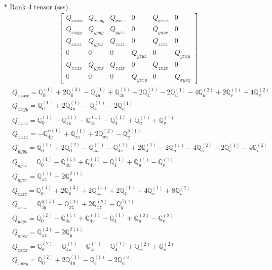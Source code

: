\documentclass[fleqn,8pt,landscape]{jsarticle}
\begin{document}
* Rank 4 tensor (sss).
\begin{align*}
\begin{bmatrix} Q_{xxxx} & Q_{xxyy} & Q_{xxzz} & 0 & Q_{xxzx} & 0 \\ Q_{xxyy} & Q_{yyyy} & Q_{yyzz} & 0 & Q_{yyzx} & 0 \\ Q_{xxzz} & Q_{yyzz} & Q_{zzzz} & 0 & Q_{zzzx} & 0 \\ 0 & 0 & 0 & Q_{yzyz} & 0 & Q_{yzxy} \\ Q_{xxzx} & Q_{yyzx} & Q_{zzzx} & 0 & Q_{zxzx} & 0 \\ 0 & 0 & 0 & Q_{yzxy} & 0 & Q_{xyxy} \end{bmatrix}
\end{align*}
\begin{align*}
& Q_{xxxx} = \mathbb{Q}_{0}^{(1)} + 2 \mathbb{Q}_{0}^{(2)} - \mathbb{Q}_{4u}^{(1)} + \mathbb{Q}_{4v}^{(1)} + 2 \mathbb{Q}_{4}^{(1)} - 2 \mathbb{Q}_{u}^{(1)} - 4 \mathbb{Q}_{u}^{(2)} + 2 \mathbb{Q}_{v}^{(1)} + 4 \mathbb{Q}_{v}^{(2)} \\
& Q_{xxyy} = \mathbb{Q}_{0}^{(1)} + 2 \mathbb{Q}_{4u}^{(1)} - \mathbb{Q}_{4}^{(1)} - 2 \mathbb{Q}_{u}^{(1)} \\
& Q_{xxzz} = \mathbb{Q}_{0}^{(1)} - \mathbb{Q}_{4u}^{(1)} - \mathbb{Q}_{4v}^{(1)} - \mathbb{Q}_{4}^{(1)} + \mathbb{Q}_{u}^{(1)} + \mathbb{Q}_{v}^{(1)} \\
& Q_{xxzx} = - \mathbb{Q}_{4y}^{\alpha(1)} + \mathbb{Q}_{xz}^{(1)} + 2 \mathbb{Q}_{xz}^{(2)} - \mathbb{Q}_{y}^{\beta(1)} \\
& Q_{yyyy} = \mathbb{Q}_{0}^{(1)} + 2 \mathbb{Q}_{0}^{(2)} - \mathbb{Q}_{4u}^{(1)} - \mathbb{Q}_{4v}^{(1)} + 2 \mathbb{Q}_{4}^{(1)} - 2 \mathbb{Q}_{u}^{(1)} - 4 \mathbb{Q}_{u}^{(2)} - 2 \mathbb{Q}_{v}^{(1)} - 4 \mathbb{Q}_{v}^{(2)} \\
& Q_{yyzz} = \mathbb{Q}_{0}^{(1)} - \mathbb{Q}_{4u}^{(1)} + \mathbb{Q}_{4v}^{(1)} - \mathbb{Q}_{4}^{(1)} + \mathbb{Q}_{u}^{(1)} - \mathbb{Q}_{v}^{(1)} \\
& Q_{yyzx} = \mathbb{Q}_{xz}^{(1)} + 2 \mathbb{Q}_{y}^{\beta(1)} \\
& Q_{zzzz} = \mathbb{Q}_{0}^{(1)} + 2 \mathbb{Q}_{0}^{(2)} + 2 \mathbb{Q}_{4u}^{(1)} + 2 \mathbb{Q}_{4}^{(1)} + 4 \mathbb{Q}_{u}^{(1)} + 8 \mathbb{Q}_{u}^{(2)} \\
& Q_{zzzx} = \mathbb{Q}_{4y}^{\alpha(1)} + \mathbb{Q}_{xz}^{(1)} + 2 \mathbb{Q}_{xz}^{(2)} - \mathbb{Q}_{y}^{\beta(1)} \\
& Q_{yzyz} = \mathbb{Q}_{0}^{(2)} - \mathbb{Q}_{4u}^{(1)} + \mathbb{Q}_{4v}^{(1)} - \mathbb{Q}_{4}^{(1)} + \mathbb{Q}_{u}^{(2)} - \mathbb{Q}_{v}^{(2)} \\
& Q_{yzxy} = \mathbb{Q}_{xz}^{(2)} + 2 \mathbb{Q}_{y}^{\beta(1)} \\
& Q_{zxzx} = \mathbb{Q}_{0}^{(2)} - \mathbb{Q}_{4u}^{(1)} - \mathbb{Q}_{4v}^{(1)} - \mathbb{Q}_{4}^{(1)} + \mathbb{Q}_{u}^{(2)} + \mathbb{Q}_{v}^{(2)} \\
& Q_{xyxy} = \mathbb{Q}_{0}^{(2)} + 2 \mathbb{Q}_{4u}^{(1)} - \mathbb{Q}_{4}^{(1)} - 2 \mathbb{Q}_{u}^{(2)}
\end{align*}
\end{document}
